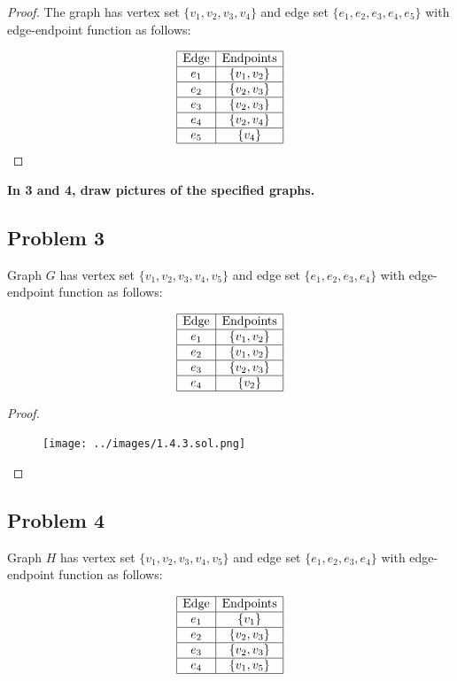 \documentclass[14pt]{extarticle}
\begin{document}
\begin{proof}
The graph has vertex set $\{v_1, v_2, v_3, v_4\}$ and edge set
$\{e_1, e_2, e_3, e_4, e_5\}$ with edge-endpoint function as follows:

$$
\begin{array}{|c|c|}
\hline
\text{Edge} & \text{Endpoints} \\
\hline
e_1 & \{v_1, v_2\} \\
\hline
e_2 & \{v_2, v_3\} \\
\hline
e_3 & \{v_2, v_3\} \\
\hline
e_4 & \{v_2, v_4\} \\
\hline
e_5 & \{v_4\} \\
\hline
\end{array}
$$
\end{proof}

{\bf In 3 and 4, draw pictures of the specified graphs.}

\subsection{Problem 3}
Graph $G$ has vertex set $\{v_1, v_2, v_3, v_4, v_5\}$ and edge set $\{e_1,
e_2, e_3, e_4\}$ with edge-endpoint function as follows:

$$
\begin{array}{|c|c|}
\hline
\text{Edge} & \text{Endpoints} \\
\hline
e_1 & \{v_1, v_2\} \\
\hline
e_2 & \{v_1, v_2\} \\
\hline
e_3 & \{v_2, v_3\} \\
\hline
e_4 & \{v_2\} \\
\hline
\end{array}
$$

\begin{proof}
\begin{figure}[ht!]
\centering
\texttt{[image: ../images/1.4.3.sol.png]}
\end{figure}
\end{proof}

\subsection{Problem 4}
Graph $H$ has vertex set $\{v_1, v_2, v_3, v_4, v_5\}$ and edge set $\{e_1,
e_2, e_3, e_4\}$ with edge-endpoint function as follows:

$$
\begin{array}{|c|c|}
\hline
\text{Edge} & \text{Endpoints} \\
\hline
e_1 & \{v_1\} \\
\hline
e_2 & \{v_2, v_3\} \\
\hline
e_3 & \{v_2, v_3\} \\
\hline
e_4 & \{v_1, v_5\} \\
\hline
\end{array}
$$
\end{document}
